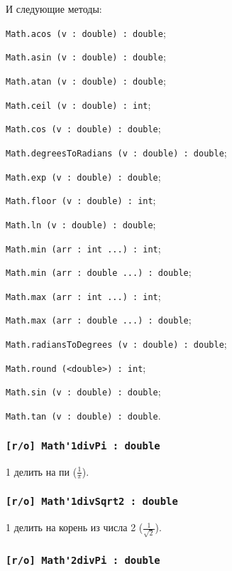 И следующие методы:
\begin{icItems}
	\item \lstinline|Math.acos (v : double) : double|;
	\item \lstinline|Math.asin (v : double) : double|;
	\item \lstinline|Math.atan (v : double) : double|;
	\item \lstinline|Math.ceil (v : double) : int|;
	\item \lstinline|Math.cos (v : double) : double|;
	\item \lstinline|Math.degreesToRadians (v : double) : double|;
	\item \lstinline|Math.exp (v : double) : double|;
	\item \lstinline|Math.floor (v : double) : int|;
	\item \lstinline|Math.ln (v : double) : double|;
	\item \lstinline|Math.min (arr : int ...) : int|;
	\item \lstinline|Math.min (arr : double ...) : double|;
	\item \lstinline|Math.max (arr : int ...) : int|;
	\item \lstinline|Math.max (arr : double ...) : double|;
	\item \lstinline|Math.radiansToDegrees (v : double) : double|;
	\item \lstinline|Math.round (<double>) : int|;
	\item \lstinline|Math.sin (v : double) : double|;
	\item \lstinline|Math.tan (v : double) : double|.
\end{icItems}

\subsubsection{\lstinline|[r/o] Math'1divPi : double|}

1 делить на пи ($\frac{1}{\pi}$).

\subsubsection{\lstinline|[r/o] Math'1divSqrt2 : double|}

1 делить на корень из числа 2 ($\frac{1}{\sqrt{2}}$).

\subsubsection{\lstinline|[r/o] Math'2divPi : double|}

